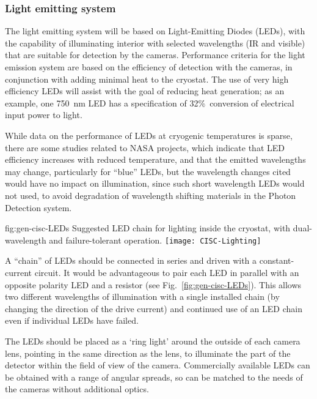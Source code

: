\subsubsection{Light emitting system}
The light emitting system will be based on Light-Emitting Diodes
(LEDs), with the capability of illuminating interior with selected
wavelengths (IR and visible) that are suitable for detection by the
cameras.  Performance criteria for the light emission system are based
on the efficiency of detection with the cameras, in conjunction with
adding minimal heat to the cryostat. The use of very high efficiency
LEDs will assist with the goal of reducing heat generation; as an
example, one \SI{750}{nm} LED has a specification of
32\%\ conversion of electrical input power to light.

While data on the performance of LEDs at cryogenic temperatures is sparse,
there are some studies related to NASA projects\cite{Carron:2017zzz}, which
indicate that LED efficiency increases with reduced temperature,
and that the emitted wavelengths may change, particularly for ``blue'' LEDs,
but the wavelength changes cited would have no impact on illumination, since
such short wavelength LEDs would not used, to avoid degradation of wavelength
shifting materials in the Photon Detection system.

\begin{dunefigure}{fig:gen-cisc-LEDs}
  {Suggested LED chain for lighting inside the cryostat, with
    dual-wavelength and failure-tolerant operation.}
\texttt{[image: CISC-Lighting]}
\end{dunefigure}

A ``chain'' of LEDs should be connected in series and driven with a
constant-current circuit. It would be advantageous to pair each
LED in parallel with an opposite polarity LED and a resistor
(see Fig.~\ref{fig:gen-cisc-LEDs}).
This allows two different wavelengths of illumination with a single installed
chain (by changing the direction of the drive current) and 
continued use of an LED chain even if individual LEDs have failed.

The LEDs should be placed as a `ring light' around the outside of each
camera lens, pointing in the same direction as the lens, to 
illuminate the part of the detector within the field of
view of the camera. Commercially available LEDs can be obtained with
a range of angular spreads, so can be matched to the needs of the
cameras without additional optics. 

